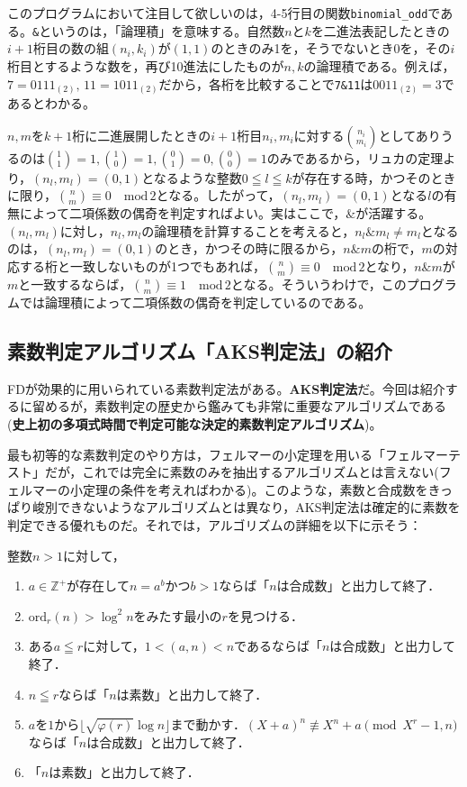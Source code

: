 このプログラムにおいて注目して欲しいのは，4-5行目の関数\texttt{binomial\_odd}である。\texttt{\&}というのは，「論理積」を意味する。自然数$n$と$k$を二進法表記したときの$i+1$桁目の数の組$(n_i,k_i)$が$(1,1)$のときのみ1を，そうでないとき0を，その$i$桁目とするような数を，再び10進法にしたものが$n,k$の論理積である。例えば，$7=0111{}_{(2)},\,11=1011{}_{(2)}$だから，各桁を比較することで\texttt{7\&11}は$0011{}_{(2)}=3$であるとわかる。

$n,m$を$k+1$桁に二進展開したときの$i+1$桁目$n_i,m_i$に対する$\binom{n_i}{m_i}$としてありうるのは$\binom{1}{1}=1,\binom{1}{0}=1,\binom{0}{1}=0,\binom{0}{0}=1$のみであるから，リュカの定理より，$(n_l,m_l)=(0,1)$となるような整数$0\leqq l \leqq k$が存在する時，かつそのときに限り，$\binom{n}{m}\equiv 0 \quad \mathrm{mod}\,2$となる。したがって，$(n_l,m_l)=(0,1)$となる$l$の有無によって二項係数の偶奇を判定すればよい。実はここで，$\mathtt{\&}$が活躍する。$(n_l,m_l)$に対し，$n_l,m_l$の論理積を計算することを考えると，$n_l\mathtt{\&}m_l\ne m_l$となるのは，$(n_l,m_l)=(0,1)$のとき，かつその時に限るから，$n\mathtt{\&}m$の桁で，$m$の対応する桁と一致しないものが1つでもあれば，$\binom{n}{m}\equiv 0\quad \mathrm{mod}\,2$となり，$n\mathtt{\&}m$が$m$と一致するならば，$\binom{n}{m}\equiv 1\quad\mathrm{mod}\,2$となる。そういうわけで，このプログラムでは論理積によって二項係数の偶奇を判定しているのである。

\subsection{素数判定アルゴリズム「AKS判定法」の紹介}
\textsf{FD}が効果的に用いられている素数判定法がある。\textbf{AKS判定法}だ。今回は紹介するに留めるが，素数判定の歴史から鑑みても非常に重要なアルゴリズムである(\textbf{史上初の多項式時間で判定可能な決定的素数判定アルゴリズム})。

最も初等的な素数判定のやり方は，フェルマーの小定理を用いる「フェルマーテスト」だが，これでは完全に素数のみを抽出するアルゴリズムとは言えない(フェルマーの小定理の条件を考えればわかる)。このような，素数と合成数をきっぱり峻別できないようなアルゴリズムとは異なり，AKS判定法は確定的に素数を判定できる優れものだ。それでは，アルゴリズムの詳細を以下に示そう：

整数$n>1$に対して，
\begin{enumerate}
    \item $a\in \mathds{Z^{+}}が存在してn=a^bかつb>1$ならば「$n$は合成数」と出力して終了．
    \item $\mathrm{ord}_r(n)>\log^2n$をみたす最小の$r$を見つける．
    \item ある$a\leqq r$に対して，$1<(a,n)<n$であるならば「$n$は合成数」と出力して終了．
    \item $n\leqq r$ならば「$n$は素数」と出力して終了．
    \item $a$を$1$から$\lfloor\sqrt{\varphi(r)}\log n\rfloor$まで動かす．$(X+a)^n\not\equiv X^n+a \pmod {X^r-1,n}$ならば「$n$は合成数」と出力して終了．
    \item 「$n$は素数」と出力して終了．
\end{enumerate}


